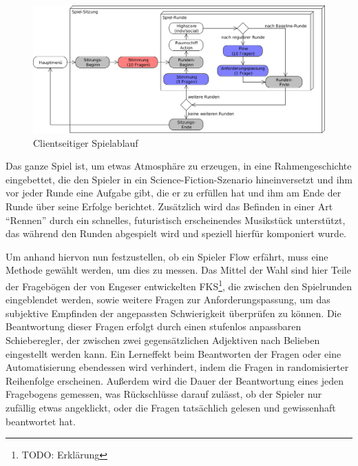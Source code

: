 \documentclass[a4paper,12pt]{scrartcl}
\begin{document}
\begin{figure}[htp]
\begin{center}
  \includegraphics[width=\textwidth]{SpielablaufClient.png}
  \caption{Clientseitiger Spielablauf}
  \label{fig:ClientSpielablauf}
\end{center}
\end{figure} 

Das ganze Spiel ist, um etwas Atmosphäre zu erzeugen, in eine Rahmengeschichte
eingebettet, die den Spieler in ein Science-Fiction-Szenario hineinversetzt und ihm vor jeder
Runde eine Aufgabe gibt, die er zu erfüllen hat und ihm am Ende der Runde über seine
Erfolge berichtet.\newline
Zusätzlich wird das Befinden in einer Art "`Rennen"' durch ein schnelles, futuristisch
erscheinendes Musikstück unterstützt, das während den Runden abgespielt wird und
speziell hierfür komponiert wurde.

Um anhand hiervon nun festzustellen, ob ein Spieler Flow erfährt, muss eine Methode
gewählt werden, um dies zu messen.\newline
Das Mittel der Wahl sind hier Teile der Fragebögen der von Engeser entwickelten
FKS\footnote{TODO: Erklärung}, die zwischen den Spielrunden eingeblendet
werden, sowie weitere Fragen zur Anforderungspassung, um das subjektive Empfinden der angepassten Schwierigkeit
überprüfen zu können. Die Beantwortung dieser Fragen erfolgt durch einen stufenlos
anpassbaren Schieberegler, der zwischen zwei gegensätzlichen Adjektiven nach
Belieben eingestellt werden kann. Ein Lerneffekt beim Beantworten der Fragen oder eine
Automatisierung ebendessen wird verhindert, indem die Fragen in randomisierter
Reihenfolge erscheinen. Außerdem wird die Dauer der Beantwortung eines jeden
Fragebogens gemessen, was Rückschlüsse darauf zulässt, ob der Spieler nur zufällig etwas angeklickt, oder die Fragen tatsächlich
gelesen und gewissenhaft beantwortet hat.
\end{document}

